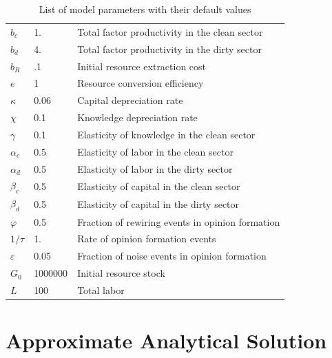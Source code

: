 \begin{table}
	\centering
	\begin{tabular}{l|l|l}
		\hline
		$b_c$ & 1. & Total factor productivity in the clean sector \\
		$b_d$ & 4. & Total factor productivity in the dirty sector \\
		$b_R$ & .1 & Initial resource extraction cost \\
		$e$   & 1 & Resource conversion efficiency \\
		$\kappa$   & 0.06 & Capital depreciation rate \\
		$\chi$      & 0.1 & Knowledge depreciation rate \\
		$\gamma$	   & 0.1 & Elasticity of knowledge in the clean sector \\
		$\alpha_c$ & 0.5 & Elasticity of labor in the clean sector \\
		$\alpha_d$ & 0.5 & Elasticity of labor in the dirty sector \\
		$\beta_c$ & 0.5 & Elasticity of capital in the clean sector \\
		$\beta_d$ & 0.5 & Elasticity of capital in the dirty sector \\
		$\varphi$ & 0.5 & Fraction of rewiring events in opinion formation \\
		$1/\tau$ & 1. & Rate of opinion formation events \\ 
		$\varepsilon$ & 0.05 & Fraction of noise events in opinion formation \\ 
        $G_0$ & 1000000 & Initial resource stock \\
        $L$ & 100 & Total labor \\ 
        \hline
	\end{tabular}
	\caption{List of model parameters with their default values}
	\label{tab:Parameter_list}
\end{table}

\section{Approximate Analytical Solution}
\label{sec:Approximation}

